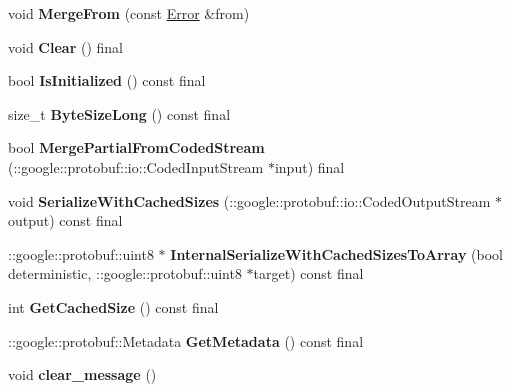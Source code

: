 \begin{DoxyCompactItemize}
void {\bfseries Merge\+From} (const \hyperlink{classcoappbrpc_1_1Error}{Error} \&from)
\item 
\mbox{\label{classcoappbrpc_1_1Error_ad9e04e9f321d36f7f4fd97847cd228ce}} 
void {\bfseries Clear} () final
\item 
\mbox{\label{classcoappbrpc_1_1Error_ad9724721599eacc6eede185afac48793}} 
bool {\bfseries Is\+Initialized} () const final
\item 
\mbox{\label{classcoappbrpc_1_1Error_aa858f0fd915c5692b4de0b551cb93b81}} 
size\+\_\+t {\bfseries Byte\+Size\+Long} () const final
\item 
\mbox{\label{classcoappbrpc_1_1Error_a615a3c932e6c7c1756cd1e53438cb119}} 
bool {\bfseries Merge\+Partial\+From\+Coded\+Stream} (\+::google\+::protobuf\+::io\+::\+Coded\+Input\+Stream $\ast$input) final
\item 
\mbox{\label{classcoappbrpc_1_1Error_a5cda1b9ed16feec0777bcbcf76f89c1e}} 
void {\bfseries Serialize\+With\+Cached\+Sizes} (\+::google\+::protobuf\+::io\+::\+Coded\+Output\+Stream $\ast$output) const final
\item 
\mbox{\label{classcoappbrpc_1_1Error_a30aa6e3b7dbd72eabb6e1d962de68e8d}} 
\+::google\+::protobuf\+::uint8 $\ast$ {\bfseries Internal\+Serialize\+With\+Cached\+Sizes\+To\+Array} (bool deterministic, \+::google\+::protobuf\+::uint8 $\ast$target) const final
\item 
\mbox{\label{classcoappbrpc_1_1Error_a9b79b7d43fbbbb4f2e9172a1f898aeb4}} 
int {\bfseries Get\+Cached\+Size} () const final
\item 
\mbox{\label{classcoappbrpc_1_1Error_a8803f21e0ec88ebc884b39923cfd3c7f}} 
\+::google\+::protobuf\+::\+Metadata {\bfseries Get\+Metadata} () const final
\item 
\mbox{\label{classcoappbrpc_1_1Error_a577934032656de1fa052835cad23626a}} 
void {\bfseries clear\+\_\+message} ()
\item 

\end{DoxyCompactItemize}

